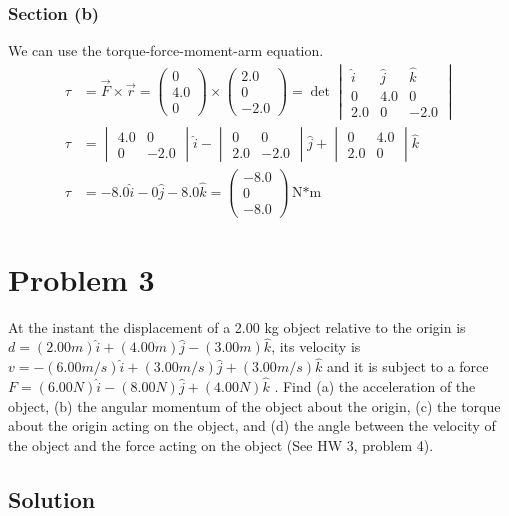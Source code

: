 \documentclass[12pt]{article}
\begin{document}
\subsubsection{Section (b)}
We can use the torque-force-moment-arm equation.
\begin{align}
    \tau    &=  \vec{F} \times \vec{r}
        =   \begin{pmatrix} 0 \\ 4.0 \\ 0 \end{pmatrix} \times \begin{pmatrix} 2.0 \\ 0 \\ -2.0 \end{pmatrix}
        =   \det\begin{vmatrix}
            \hat{i} &\hat{j}&\hat{k}\\
            0       &4.0    &0      \\
            2.0     &0      &-2.0
        \end{vmatrix}\\
    \tau    &=  \begin{vmatrix}4.0&0\\0&-2.0\end{vmatrix}\hat{i} - 
                \begin{vmatrix}0&0\\2.0&-2.0\end{vmatrix}\hat{j} + 
                \begin{vmatrix}0&4.0\\2.0&0\end{vmatrix}\hat{k}\\
    \tau    &=  -8.0\hat{i} - 0\hat{j} - 8.0\hat{k}
        =   \boxed{\begin{pmatrix}-8.0\\0\\-8.0\end{pmatrix}\unit{\newton*\meter}}
\end{align}

\pagebreak
\section{Problem 3}
At the instant the displacement of a 2.00 kg object relative to the origin is \(d = (2.00 m)\hat{i} + (4.00 m)\hat{j} - (3.00 m)\hat{k}\), its velocity is \(v = -(6.00 m/s)\hat{i} + (3.00 m/s)\hat{j} + (3.00 m/s)\hat{k}\) and it is subject to a force \(F = (6.00 N)\hat{i} - (8.00 N)\hat{j} + (4.00 N)\hat{k}\) . Find (a) the acceleration of the object, (b) the angular momentum of the object about the origin, (c) the torque about the origin acting on the object, and (d) the angle between the velocity of the object and the force acting on the object (See HW 3, problem 4).

\subsection{Solution}
\end{document}
